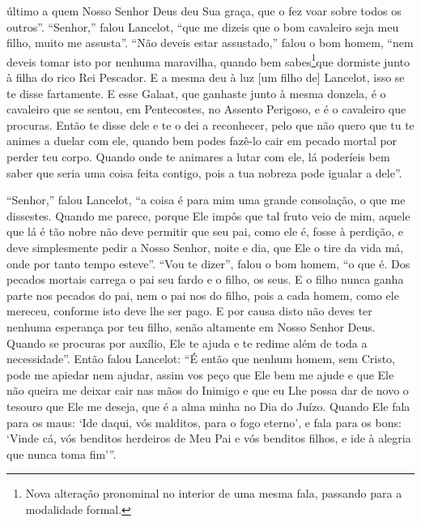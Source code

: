 último a quem Nosso Senhor Deus deu Sua graça, que o fez voar sobre todos os
outros”. “Senhor,” falou Lancelot, “que me dizeis que o bom
cavaleiro seja meu filho, muito me assusta”. “Não deveis estar assustado,”
falou o bom homem, “nem deveis tomar isto por nenhuma maravilha, quando bem
sabes\footnote{ Nova alteração pronominal no interior de uma mesma fala,
passando para a modalidade formal. }que dormiste junto à filha do
rico Rei Pescador. E a mesma deu à luz [um filho de] Lancelot, isso se te disse fartamente.
E esse Galaat, que ganhaste junto à mesma donzela, é o cavaleiro que se sentou,
em Pentecostes, no Assento Perigoso, e é o cavaleiro que procuras. Então te
disse dele e te o dei a reconhecer, pelo que não quero que tu te animes a
duelar com ele, quando bem podes fazê-lo cair em pecado mortal por perder teu
corpo. Quando onde te animares a lutar com ele, lá poderíeis bem saber que
seria uma coisa feita contigo, pois a tua nobreza pode igualar a dele”.

 “Senhor,” falou Lancelot, “a coisa é para mim uma grande consolação, o que me
dissestes. Quando me parece, porque Ele impôs que tal fruto veio de mim, aquele
que lá é tão nobre não deve permitir que seu pai, como ele é, fosse à perdição,
e deve simplesmente pedir a Nosso Senhor, noite e dia, que Ele o tire da vida
má, onde por tanto tempo esteve”. “Vou te dizer”, falou o bom homem, “o que é.
Dos pecados mortais carrega o pai seu fardo e o filho, os seus. E o filho nunca
ganha parte nos pecados do pai, nem o pai nos do filho, pois a cada homem, como
ele mereceu, conforme isto deve lhe ser pago. E por causa disto não deves ter
nenhuma esperança por teu filho, senão altamente em Nosso Senhor Deus. Quando
se procuras por auxílio, Ele te ajuda e te redime além de toda a necessidade”.
Então falou Lancelot: “É então que nenhum homem, sem Cristo, pode me apiedar
nem ajudar, assim vos peço que Ele bem me ajude e que Ele não queira me deixar
cair nas mãos do Inimigo e que eu Lhe possa dar de novo o tesouro que Ele me
deseja, que é a alma minha no Dia do Juízo. Quando Ele fala para os maus: ‘Ide
daqui, vós malditos, para o fogo eterno’, e fala para os bons: ‘Vinde cá, vós
benditos herdeiros de Meu Pai e vós benditos filhos, e ide à alegria que nunca
toma fim’”. 


